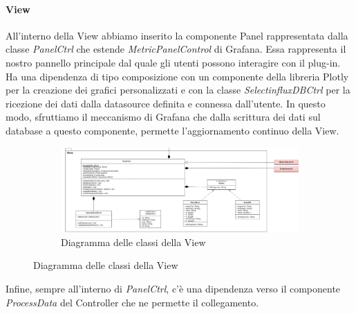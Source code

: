\paragraph{View} \mbox{}
All'interno della View abbiamo inserito la componente Panel rappresentata dalla classe \textit{PanelCtrl} che estende \textit{MetricPanelControl} di Grafana\glo. Essa rappresenta il nostro pannello principale dal quale gli utenti possono interagire con il plug-in.
Ha una dipendenza di tipo composizione con un componente della libreria Plotly per la creazione dei grafici personalizzati e con la classe \textit{SelectinfluxDBCtrl} per la ricezione dei dati dalla datasource definita e connessa dall'utente. In questo modo, sfruttiamo il meccanismo di Grafana che dalla scrittura dei dati sul database a questo componente, permette l'aggiornamento continuo della View.
\mbox{}
\begin{landscape}
	\begin{figure}
		\begin{figure} [H]
			\includegraphics[width=\linewidth]{./img/Diagrammi/view-plug-in.png}
			\caption{Diagramma delle classi della View}
		\end{figure}
	\end{figure}
\end{landscape}
Infine, sempre all'interno di \textit{PanelCtrl}, c'è una dipendenza verso il componente \textit{ProcessData} del Controller che ne permette il collegamento.
